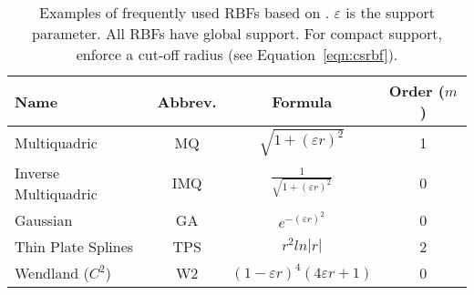 
\newcommand{\rbf}[4]{#1 & #2 & #3 & #4}
\begin{table}[t]
   \centering
   \begin{tabular}{L | C | c |C| } %
   \rbf{Name}{Abbrev.}{Formula}{Order ($m$)} \\
   \hline\hline
   \rbf{Multiquadric}{MQ}{$\sqrt{1+(\varepsilon r)^2}$}{1} \\
   \rbf{Inverse Multiquadric}{IMQ}{$\frac{1}{\sqrt{1+(\varepsilon r)^2}}$}{0} \\
   \rbf{Gaussian}{GA}{$e^{-(\varepsilon r)^2}$}{0} \\
   \rbf{Thin Plate Splines}{TPS}{$r^2 ln |r|$}{2} \\
   \rbf{Wendland ($C^2$)}{W2}{$(1-\varepsilon r)^4 (4\varepsilon r + 1)$}{0}
   \end{tabular}
   \caption{Examples of frequently used RBFs based on \cite{Fornberg2008, Fasshauer2007}. $\varepsilon$ is the support parameter. 
   All RBFs have global support. For compact support, enforce a cut-off radius (see Equation~\ref{eqn:csrbf}).}
   \label{tbl:rbfs}
\end{table}